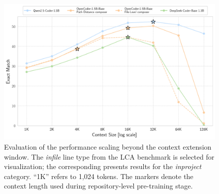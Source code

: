 \begin{figure}[ht]
    \centering
    \includegraphics[width=\textwidth]{figures/beyond-training-window-infile.pdf}
    \caption{Evaluation of the performance scaling beyond the context extension window. The \textit{infile} line type from the LCA benchmark is selected for visualization; the corresponding  presents results for the \textit{inproject} category. ``1K'' refers to 1,024 tokens. The \raisebox{-0.3ex}{\FiveStarOpen} markers denote the context length used during repository-level pre-training stage.}\label{fig:beyond-training-window-infile}
\end{figure}
